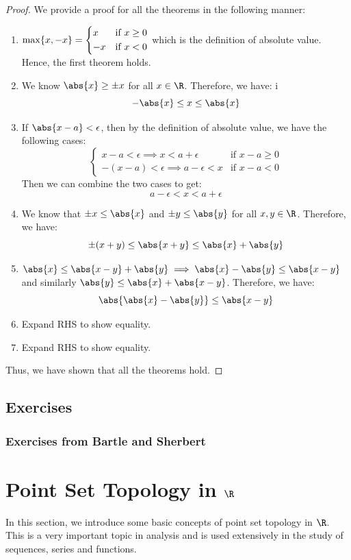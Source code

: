 \documentclass[openany]{book}
\begin{document}
\begin{proof}
    We provide a proof for all the theorems in the following manner:
    \begin{enumerate}
    \item $\max\{x, -x\} = \begin{dcases}
        x & \text{if } x \geq 0 \\
        -x & \text{if } x < 0
    \end{dcases}$ which is the definition of absolute value. Hence, the first theorem holds.
    \item We know $\abs{x} \geq \pm x$ for all $x \in \R$. Therefore, we have:
i    $$-\abs{x} \leq x \leq \abs{x}$$
    \item If $\abs{x - a} < \epsilon$, then by the definition of absolute value, we have the following cases: 
    $$\begin{cases}
        x - a < \epsilon \implies x < a + \epsilon & \text{if } x - a \geq 0  \\
        -(x - a) < \epsilon \implies a - \epsilon < x & \text{if } x - a < 0
    \end{cases}$$
    Then we can combine the two cases to get:
    $$a - \epsilon < x < a + \epsilon$$
    \item We know that $\pm x \leq \abs{x}$ and $\pm y \leq \abs{y}$ for all $x, y \in \R$. Therefore, we have:
    $$\pm(x + y) \leq \abs{x + y} \leq \abs{x} + \abs{y}$$
    \item $\abs{x} \leq \abs{x-y} + \abs{y} \implies \abs{x} - \abs{y} \leq \abs{x - y}$ and similarly $\abs{y} \leq \abs{x} + \abs{x - y}$. Therefore, we have:
    $$\abs{\abs{x} - \abs{y}} \leq \abs{x - y}$$
    \item Expand RHS to show equality.
    \item Expand RHS to show equality.
    \end{enumerate}
    Thus, we have shown that all the theorems hold.
\end{proof}
\section{Exercises}
\subsection{Exercises from Bartle and Sherbert}



\chapter{Point Set Topology in $\R$}
In this section, we introduce some basic concepts of point set topology in $\R$. This is a very important topic in analysis and is used extensively in the study of sequences, series and functions.
\end{document}
